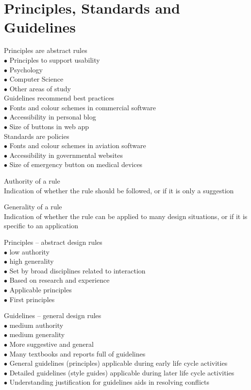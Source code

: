 \documentclass[]{project_plan}
\newcommand{\bulletPoint}{\hspace{-3.1pt}$\bullet$ \hspace{5pt}}
\begin{document}
\section{Principles, Standards and Guidelines}
Principles are abstract rules\\
\bulletPoint Principles to support usability\\
\bulletPoint Psychology\\
\bulletPoint Computer Science\\
\bulletPoint Other areas of study\\
Guidelines recommend best practices\\
\bulletPoint Fonts and colour schemes in commercial software\\
\bulletPoint Accessibility in personal blog\\
\bulletPoint Size of buttons in web app\\
Standards are policies\\
\bulletPoint Fonts and colour schemes in aviation software\\
\bulletPoint Accessibility in governmental websites\\
\bulletPoint Size of emergency button on medical devices

Authority of a rule\\
Indication of whether the rule should be followed, or if it is only a suggestion

Generality of a rule\\
Indication of whether the rule can be applied to many design situations,
or if it is specific to an application

Principles – abstract design rules\\
\bulletPoint low authority\\
\bulletPoint high generality\\
\bulletPoint Set by broad disciplines related to interaction\\
\bulletPoint Based on research and experience\\
\bulletPoint Applicable principles\\
\bulletPoint First principles

Guidelines – general design rules\\
\bulletPoint medium authority\\
\bulletPoint medium generality\\
\bulletPoint More suggestive and general\\
\bulletPoint Many textbooks and reports full of guidelines\\
\bulletPoint General guidelines (principles) applicable during early life cycle activities\\
\bulletPoint Detailed guidelines (style guides) applicable during later life cycle activities\\
\bulletPoint Understanding justification for guidelines aids in resolving conflicts
\end{document}
